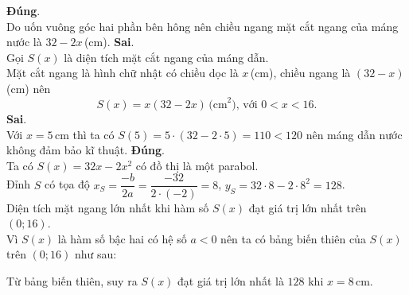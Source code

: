\begin{ex}
{\begin{center}
		\end{center}
		\begin{itemchoice}
			\itemch \textbf{Đúng}.\\
			Do uốn vuông góc hai phần bên hông nên chiều ngang mặt cắt ngang của máng nước là $32-2x$\,(cm).
			\itemch \textbf{Sai}.\\
			Gọi $S(x)$ là diện tích mặt cắt ngang của máng dẫn.\\
			Mặt cắt ngang là hình chữ nhật có chiều dọc là $x$\,(cm), chiều ngang là $(32-x)$\,(cm) nên
			\[S(x)=x(32-2x)\,\text{(cm}^2)\text{, với }0<x<16.\]
			\itemch \textbf{Sai}.\\
			Với $x=5$\,cm thì ta có $S(5)=5\cdot(32-2\cdot5)=110<120$ nên máng dẫn nước không đảm bảo kĩ thuật.
			\itemch \textbf{Đúng}.\\
			Ta có $S(x)=32x-2x^2$ có đồ thị là một parabol.\\
			Đỉnh $S$ có tọa độ $x_S=\dfrac{-b}{2a}=\dfrac{-32}{2\cdot(-2)}=8$, $y_S=32\cdot8-2\cdot8^2=128$.\\
			Diện tích mặt ngang lớn nhất khi hàm số $S(x)$ đạt giá trị lớn nhất trên $(0;16)$.\\ 
			Vì $S(x)$ là hàm số bậc hai có hệ số $a<0$ nên ta có bảng biến thiên của $S(x)$ trên $(0;16)$ như sau:
			\begin{center}
			\end{center}
			Từ bảng biến thiên, suy ra $S(x)$ đạt giá trị lớn nhất là $128$ khi $x=8$\,cm.
		\end{itemchoice}
	}
\end{ex}


